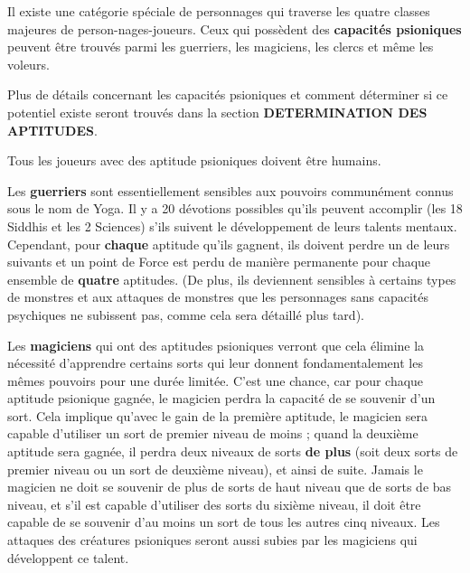{\parindent0pt

Il existe une catégorie spéciale de personnages qui traverse les quatre classes majeures de person-nages-joueurs. Ceux qui possèdent des \textbf{capacités psioniques} peuvent être trouvés parmi les guerriers, les magiciens, les clercs et même les voleurs.

\bigskip

Plus de détails concernant les capacités psioniques et comment déterminer si ce potentiel existe seront trouvés dans la section \textbf{DETERMINATION DES APTITUDES}.



\bigskip

Tous les joueurs avec des aptitude psioniques doivent être humains.

\bigskip

Les \textbf{guerriers} sont essentiellement sensibles aux pouvoirs communément connus sous le nom de Yoga. Il y a 20 \og dévotions \fg{} possibles qu'ils peuvent accomplir (les 18 Siddhis et les 2 Sciences) s'ils suivent le développement de leurs talents mentaux. Cependant, pour \textbf{chaque} aptitude qu'ils gagnent, ils doivent perdre un de leurs suivants et un point de Force est perdu de manière permanente pour chaque ensemble de \textbf{quatre} aptitudes. (De plus, ils deviennent sensibles à certains types de monstres et aux attaques de monstres que les personnages sans capacités psychiques ne subissent pas, comme cela sera détaillé plus tard).

\bigskip

Les \textbf{magiciens} qui ont des aptitudes psioniques verront que cela élimine la nécessité d'apprendre certains sorts qui leur donnent fondamentalement les mêmes pouvoirs pour une durée limitée. C'est une chance, car pour chaque aptitude psionique gagnée, le magicien perdra la capacité de se souvenir d'un sort. Cela implique qu'avec le gain de la première aptitude, le magicien sera capable d'utiliser un sort de premier niveau de moins ; quand la deuxième aptitude sera gagnée, il perdra deux niveaux de sorts \textbf{de plus} (soit deux sorts de premier niveau ou un sort de deuxième niveau), et ainsi de suite. Jamais le magicien ne doit se souvenir de plus de sorts de haut niveau que de sorts de bas niveau, et s'il est capable d'utiliser des sorts du sixième niveau, il doit être capable de se souvenir d'au moins un sort de tous les autres cinq niveaux. Les attaques des créatures psioniques seront aussi subies par les magiciens qui développent ce talent.

}

